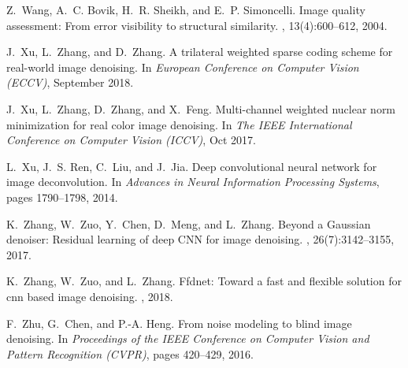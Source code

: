 \documentclass[10pt,twocolumn,letterpaper]{article}
\begin{document}
{\begin{thebibliography}{10}
Z.~Wang, A.~C. Bovik, H.~R. Sheikh, and E.~P. Simoncelli.
\newblock Image quality assessment: {F}rom error visibility to structural
  similarity.
, 13(4):600--612, 2004.

J.~Xu, L.~Zhang, and D.~Zhang.
\newblock A trilateral weighted sparse coding scheme for real-world image
  denoising.
\newblock In {\em European Conference on Computer Vision (ECCV)}, September
  2018.

J.~Xu, L.~Zhang, D.~Zhang, and X.~Feng.
\newblock Multi-channel weighted nuclear norm minimization for real color image
  denoising.
\newblock In {\em The IEEE International Conference on Computer Vision (ICCV)},
  Oct 2017.

L.~Xu, J.~S. Ren, C.~Liu, and J.~Jia.
\newblock Deep convolutional neural network for image deconvolution.
\newblock In {\em Advances in Neural Information Processing Systems}, pages
  1790--1798, 2014.

K.~Zhang, W.~Zuo, Y.~Chen, D.~Meng, and L.~Zhang.
\newblock Beyond a {G}aussian denoiser: {R}esidual learning of deep {CNN} for
  image denoising.
, 26(7):3142--3155, 2017.

K.~Zhang, W.~Zuo, and L.~Zhang.
\newblock Ffdnet: Toward a fast and flexible solution for cnn based image
  denoising.
, 2018.

F.~Zhu, G.~Chen, and P.-A. Heng.
\newblock From noise modeling to blind image denoising.
\newblock In {\em Proceedings of the IEEE Conference on Computer Vision and
  Pattern Recognition (CVPR)}, pages 420--429, 2016.

\end{thebibliography}

}
\end{document}

